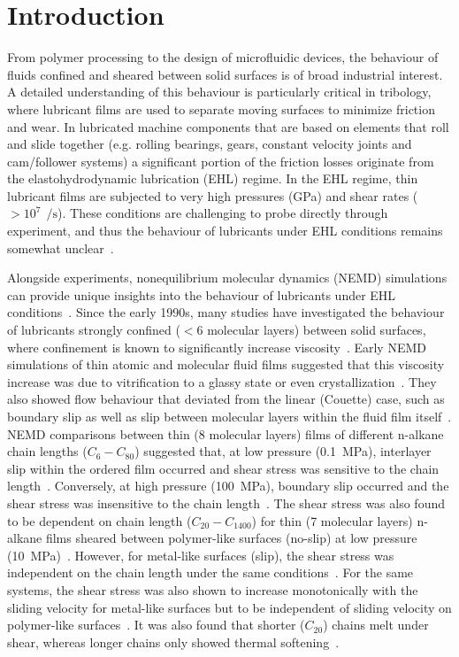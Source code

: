 \documentclass[5p]{elsarticle}
\begin{document}
\section{Introduction}

From polymer processing to the design of microfluidic devices, the behaviour of fluids confined and sheared between solid surfaces is of broad industrial interest. A detailed understanding of this behaviour is particularly critical in tribology, where lubricant films are used to separate moving surfaces to minimize friction and wear. In lubricated machine components that are based on elements that roll and slide together (e.g. rolling bearings, gears, constant velocity joints and cam/follower systems) a significant portion of the friction losses originate from the elastohydrodynamic lubrication (EHL) regime. In the EHL regime, thin lubricant films are subjected to very high pressures (GPa) and shear rates ($> 10^{7}~\SI{}{\per\second}$). These conditions are challenging to probe directly through experiment, and thus the behaviour of lubricants under EHL conditions remains somewhat unclear~\cite{Spikes2014}.

Alongside experiments, nonequilibrium molecular dynamics (NEMD) simulations can provide unique insights into the behaviour of lubricants under EHL conditions~\cite{Ewen2018}. Since the early 1990s, many studies have investigated the behaviour of lubricants strongly confined ($< 6$ molecular layers) between solid surfaces, where confinement is known to significantly increase viscosity~\cite{Granick1991}. Early NEMD simulations of thin atomic and molecular fluid films suggested that this viscosity increase was due to vitrification to a glassy state or even crystallization~\cite{Thompson1992}. They also showed flow behaviour that deviated from the linear (Couette) case, such as boundary slip as well as slip between molecular layers within the fluid film itself~\cite{Thompson1990}. NEMD comparisons between thin (8 molecular layers) films of different n-alkane chain lengths ($C_6 - C_{80}$) suggested that, at low pressure (\SI{0.1}{\mega\pascal}), interlayer slip within the ordered film occurred and shear stress was sensitive to the chain length~\cite{Koike1998}. Conversely, at high pressure (\SI{100}{\mega\pascal}), boundary slip occurred and the shear stress was insensitive to the chain length~\cite{Koike1998}. The shear stress was also found to be dependent on chain length ($C_{20} - C_{1400}$) for thin (7 molecular layers) n-alkane films sheared between polymer-like surfaces (no-slip) at low pressure (\SI{10}{\mega\pascal})~\cite{Sivebaek2008}. However, for metal-like surfaces (slip), the shear stress was independent on the chain length under the same conditions~\cite{Sivebaek2008}. For the same systems, the shear stress was also shown to increase monotonically with the sliding velocity for metal-like surfaces but to be independent of sliding velocity on polymer-like surfaces~\cite{Sivebaek2010}. It was also found that shorter ($C_{20}$) chains melt under shear, whereas longer chains only showed thermal softening~\cite{Sivebaek2012}.
\end{document}
